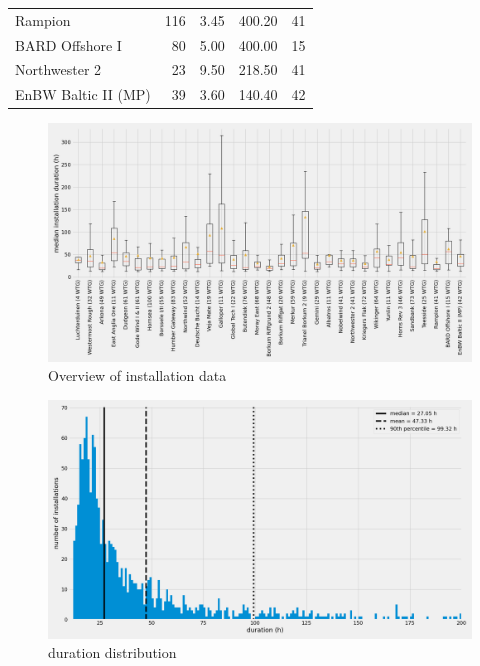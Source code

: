 \documentclass[wes, manuscript]{copernicus}
\begin{document}
\begin{table}
\begin{tabular}{lrrrr}
            Rampion &                 116 &                 3.45 &              400.20 &                                 41 \\
     BARD Oﬀshore I &                  80 &                 5.00 &              400.00 &                                 15 \\
      Northwester 2 &                  23 &                 9.50 &              218.50 &                                 41 \\
EnBW Baltic II (MP) &                  39 &                 3.60 &              140.40 &                                 42 \\
    \bottomrule
    \end{tabular}
    \label{tab:installations}
\end{table}

\clearpage
\newpage

\begin{figure}[h]
    \centering
    \includegraphics[width=\textwidth]{figures/installations_overview.png}
    \caption{Overview of installation data}
    \label{fig:overview}
\end{figure}

\begin{figure}[h]
    \centering
    \includegraphics[width=\textwidth]{figures/duration_distribution.png}
    \caption{duration distribution}
    \label{fig:distribution}
\end{figure}
\end{document}
